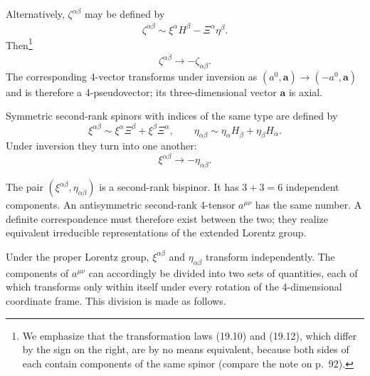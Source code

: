 Alternatively, $\zeta^{\alpha\dot\beta}$ may be defined by
\begin{equation}
\zeta^{\alpha\dot\beta}\sim\xi^\alpha H^{\dot\beta}-\Xi^\alpha\eta^{\dot\beta}.
\tag{19.11}
\end{equation}
Then\footnote{We emphasize that the transformation laws (19.10) and (19.12), which differ by the sign on the right, are by no means equivalent, because both sides of each contain components of the same spinor (compare the note on p.~92).}
\begin{equation}
\zeta^{\alpha\dot\beta}\to-\zeta_{\dot\alpha\beta}.
\tag{19.12}
\end{equation}
The corresponding 4-vector transforms under inversion as $(a^0,\mathbf a)\to(-a^0,\mathbf a)$ and is therefore a 4-pseudovector; its three-dimensional vector $\mathbf a$ is axial.

Symmetric second-rank spinors with indices of the same type are defined by
\begin{equation}
\xi^{\alpha\beta}\sim\xi^\alpha\Xi^\beta+\xi^\beta\Xi^\alpha,
\qquad
\eta_{\dot\alpha\dot\beta}\sim\eta_{\dot\alpha}H_{\dot\beta}+\eta_{\dot\beta}H_{\dot\alpha}.
\tag{19.13}
\end{equation}
Under inversion they turn into one another:
\begin{equation}
\xi^{\alpha\beta}\to-\eta_{\dot\alpha\dot\beta}.
\tag{19.14}
\end{equation}

The pair $(\xi^{\alpha\beta},\eta_{\dot\alpha\dot\beta})$ is a second-rank bispinor. It has $3+3=6$ independent components. An antisymmetric second-rank 4-tensor $a^{\mu\nu}$ has the same number. A definite correspondence must therefore exist between the two; they realize equivalent irreducible representations of the extended Lorentz group.

Under the proper Lorentz group, $\xi^{\alpha\beta}$ and $\eta_{\dot\alpha\dot\beta}$ transform independently. The components of $a^{\mu\nu}$ can accordingly be divided into two sets of quantities, each of which transforms only within itself under every rotation of the 4-dimensional coordinate frame. This division is made as follows.

